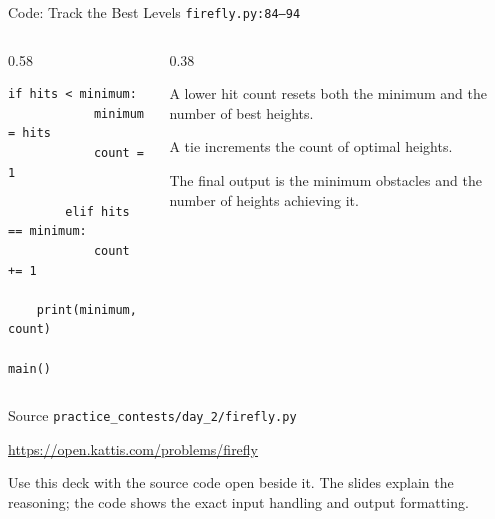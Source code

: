 \documentclass[aspectratio=169,11pt]{beamer}
\begin{document}
\begin{frame}[fragile]{Code: Track the Best Levels}
\scriptsize
{} \texttt{firefly.py:84--94}

\vspace{0.08cm}
\begin{columns}[T,totalwidth=\textwidth]
\begin{column}{0.58\textwidth}
\begin{lstlisting}[style=cpcode]
        if hits < minimum:
            minimum = hits
            count = 1

        elif hits == minimum:
            count += 1

    print(minimum, count)

main()
\end{lstlisting}
\end{column}
\begin{column}{0.38\textwidth}
\begin{tightitemize}
  \item A lower hit count resets both the minimum and the number of best heights.
  \item A tie increments the count of optimal heights.
  \item The final output is the minimum obstacles and the number of heights achieving it.
\end{tightitemize}
\end{column}
\end{columns}
\end{frame}

\begin{frame}{Source}
\small
{} \texttt{practice\_contests/day\_2/firefly.py}

\vspace{0.3cm}
 \url{https://open.kattis.com/problems/firefly}

\vspace{0.45cm}
Use this deck with the source code open beside it. The slides explain the reasoning; the code shows the exact input handling and output formatting.
\end{frame}
\end{document}
